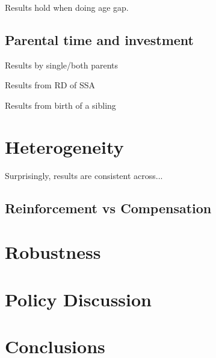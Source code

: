 Results hold when doing age gap.

\subsection{Parental time and investment}

Results by single/both parents

Results from RD of SSA

Results from birth of a sibling

\section{Heterogeneity}\label{sec:heterogeneity}

Surprisingly, results are consistent across...

\subsection{Reinforcement vs Compensation}

\section{Robustness}\label{sec:robustness}

\section{Policy Discussion}\label{sec:policy}

\section{Conclusions}\label{sec:conclusions}






